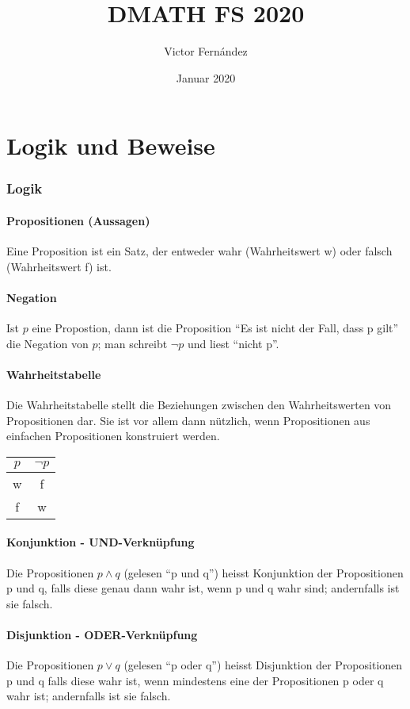\documentclass[10pt,a4paper]{article}
\title{DMATH FS 2020}
\author{Victor Fernández}
\date{Januar 2020}
\begin{document}
\maketitle
\tableofcontents
\thispagestyle{empty}
\pagebreak

\part{Logik und Beweise}
\section{Logik}
\subsection{Propositionen (Aussagen)}Eine Proposition ist ein Satz, der entweder wahr (Wahrheitswert w) oder falsch (Wahrheitswert f) ist.
\subsection{Negation}Ist $p$ eine Propostion, dann ist die Proposition "`Es ist nicht der Fall, dass p gilt"' die Negation von $p$; man schreibt $\neg p$ und liest "`nicht p"'.

\subsection{Wahrheitstabelle}Die Wahrheitstabelle stellt die Beziehungen zwischen den Wahrheitswerten von Propositionen dar. Sie ist vor allem dann nützlich, wenn Propositionen aus einfachen Propositionen konstruiert werden.\\
\begin{tabular}{|c|c|}
    \hline
        $p$&$\neg p$\\
        \hline
        w&f\\
        f&w\\
    \hline
\end{tabular}

\subsection{Konjunktion - UND-Verknüpfung}Die Propositionen $p\wedge q$ (gelesen "`p und q"') heisst Konjunktion der Propositionen p und q, falls diese genau dann wahr ist, wenn p und q wahr sind; andernfalls ist sie falsch.

\subsection{Disjunktion - ODER-Verknüpfung}Die Propositionen $p\vee q$ (gelesen "`p oder q"') heisst Disjunktion der Propositionen p und q falls diese wahr ist, wenn mindestens eine der Propositionen p oder q wahr ist; andernfalls ist sie falsch.
\end{document}
